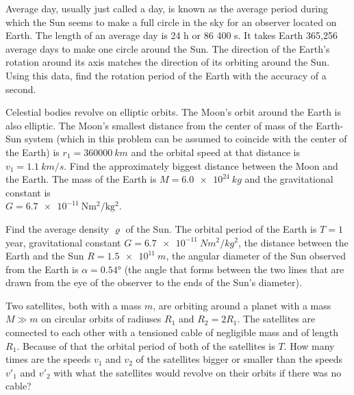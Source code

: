 \documentclass[11pt]{article}
\begin{document}

\probeng
Average day, usually just called a day, is known as the average period during which the Sun seems to make a full circle in the sky for an observer located on Earth. The length of an average day is 24 h or 86 400 s. It takes Earth 365,256 average days to make one circle around the Sun. The direction of the Earth’s rotation around its axis matches the direction of its orbiting around the Sun. Using this data, find the rotation period of the Earth with the accuracy of a second.
\probend
\bigskip


\probeng
Celestial bodies revolve on elliptic orbits. The Moon’s orbit around the Earth is also elliptic. The Moon’s smallest distance from the center of mass of the Earth-Sun system (which in this problem can be assumed to coincide with the center of the Earth) is $r_{1}=\SI{360000}{km}$ and the orbital speed at that distance is $v_1=\SI{1.1}{km/s}$. Find the approximately biggest distance between the Moon and the Earth. The mass of the Earth is $M=\SI{6.0e24}{kg}$ and the gravitational constant is\\ $G=\SI{6.7e-11}{\newton\metre\squared\per\kilo\gram\squared}$.
\probend
\bigskip


\probeng
Find the average density $\varrho$ of the Sun. The orbital period of the Earth is $T=1$ year, gravitational constant $G=\SI{6.7e-11}{N m^2/kg^2}$, the distance between the Earth and the Sun $R=\SI{1.5e11}{m}$, the angular diameter of the Sun observed from the Earth is $\alpha=\ang{0,54}$ (the angle that forms between the two lines that are drawn from the eye of the observer to the ends of the Sun’s diameter).
\probend
\bigskip


\probeng
Two satellites, both with a mass $m$, are orbiting around a planet with a mass $M\gg m$ on circular orbits of radiuses $R_1$ and $R_2=2R_1$. The satellites are connected to each other with a tensioned cable of negligible mass and of length $R_1$. Because of that the orbital period of both of the satellites is $T$. How many times are the speeds $v_1$ and $v_2$ of the satellites bigger or smaller than the speeds $v'_1$ and $v'_2$ with what the satellites would revolve on their orbits if there was no cable?
\probend
\bigskip
\end{document}
